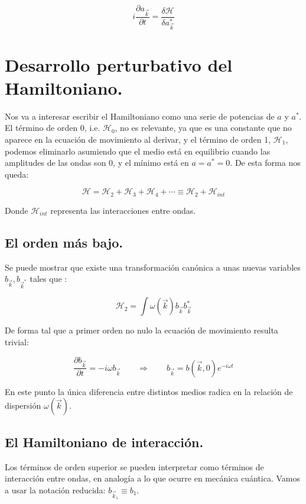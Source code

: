 \begin{equation}
	i\frac{\partial a_{\vec k}}{\partial t} = \frac{\delta \mathcal{H}}{\delta a_{\vec k}^*}
\end{equation}

\section{Desarrollo perturbativo del Hamiltoniano.}
Nos va a interesar escribir el Hamiltoniano como una serie de potencias de $a$ y $a^*$. El término de orden 0, i.e. $\mathcal{H}_0$, no es relevante, ya que es una constante que no aparece en la ecuación de movimiento al derivar, y el término de orden 1, $\mathcal{H}_1$, podemos eliminarlo asumiendo que el medio está en equilibrio cuando las amplitudes de las ondas son 0, y el mínimo está en $a=a^*=0$. De esta forma nos queda:

\begin{equation}
	\mathcal{H} = \mathcal{H}_2 + \mathcal{H}_3 + \mathcal{H}_4 + \cdots \equiv \mathcal{H}_2 + \mathcal{H}_{int}
\end{equation}

Donde $\mathcal{H}_{int}$ representa las interacciones entre ondas. 
\subsection*{El orden más bajo.}

Se puede mostrar que existe una transformación canónica a unas nuevas variables $b_{\vec{k}},b_{\vec{k}^*}$ tales que \cite{zakharovKolmogorovSpectraTurbulence1992}:

\begin{equation}
	\mathcal{H}_2 = \int \omega(\vec k)b_{\vec k}b^*_{\vec k}
\end{equation} 

De forma tal que a primer orden no nulo la ecuación de movimiento resulta trivial:

\begin{equation}
	\frac{\partial b_{\vec{k}}}{\partial t}=-i\omega b_{\vec{k}} \qquad \Rightarrow{} \qquad b_{\vec{k}}=b(\vec k, 0)e^{-i\omega t}
\end{equation}

En este punto la única diferencia entre distintos medios radica en la relación de dispersión $\omega(\vec k)$.

\subsection*{El Hamiltoniano de interacción.}
Los términos de orden superior se pueden interpretar como términos de interacción entre ondas, en analogía a lo que ocurre en mecánica cuántica. Vamos a usar la notación reducida: $b_{\vec k_1} \equiv b_1$.

